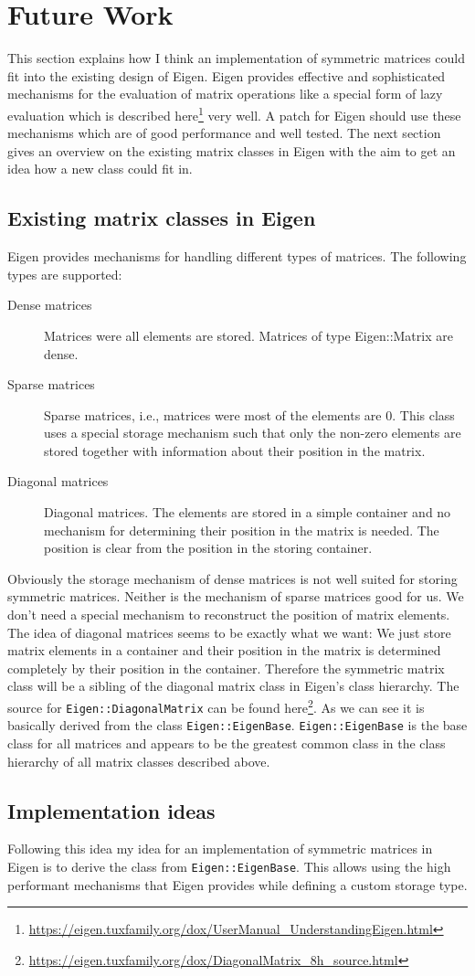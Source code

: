 \documentclass[a4wide]{scrartcl}
\begin{document}
\section{Future Work}
This section explains how I think an implementation of symmetric matrices could fit into the existing design of Eigen. Eigen provides effective and sophisticated mechanisms for the evaluation of matrix operations like a special form of lazy evaluation which is described here\footnote{\url{https://eigen.tuxfamily.org/dox/UserManual_UnderstandingEigen.html}} very well. A patch for Eigen should use these mechanisms which are of good performance and well tested. The next section gives an overview on the existing matrix classes in Eigen with the aim to get an idea how a new class could fit in.
\subsection{Existing matrix classes in Eigen}
Eigen provides mechanisms for handling different types of matrices. The following types are supported:
\begin{description}
\item[Dense matrices]Matrices were all elements are stored. Matrices of type Eigen::Matrix are dense.
\item[Sparse matrices]Sparse matrices, i.e., matrices were most of the elements are $0$. This class uses a special storage mechanism such that only the non-zero elements are stored together with information about their position in the matrix.
\item[Diagonal matrices]Diagonal matrices. The elements are stored in a simple container and no mechanism for determining their position in the matrix is needed. The position is clear from the position in the storing container.
\end{description}
Obviously the storage mechanism of dense matrices is not well suited for storing symmetric matrices. Neither is the mechanism of sparse matrices  good for us. We don't need a special mechanism to reconstruct the position of matrix elements. The idea of diagonal matrices seems to be exactly what we want: We just store matrix elements in a container and their position in the matrix is determined completely by their position in the container. \newline
Therefore the symmetric matrix class will be a sibling of the diagonal matrix class in Eigen's class hierarchy. The source for \texttt{Eigen::DiagonalMatrix} can be found here\footnote{\url{https://eigen.tuxfamily.org/dox/DiagonalMatrix_8h_source.html}}. As we can see it is basically derived from the class \texttt{Eigen::EigenBase}. \texttt{Eigen::EigenBase} is the base class for all matrices and appears to be the greatest common class in the class hierarchy of all matrix classes described above.
\subsection{Implementation ideas}
Following this idea my idea for an implementation of symmetric matrices in Eigen is to derive the class from \texttt{Eigen::EigenBase}. This allows using the high performant mechanisms that Eigen provides while defining a custom storage type.
\end{document}
